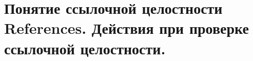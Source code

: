 {
	\section{Понятие ссылочной целостности References. Действия при проверке ссылочной целостности.}
	\newpage
}
